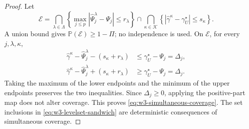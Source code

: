 \documentclass[11pt]{article}
\theoremstyle{remark}
\newcommand{\Pp}{\mathbb P}
\begin{document}
\begin{proof}
Let
\begin{equation}
 \mathcal E=
 \bigcap_{\lambda\in\Lambda}
 \left\{\max_{j\le p}
 |\widehat\Psi_j^\lambda-\Psi_j|\le r_\lambda\right\}
 \cap
 \bigcap_{\kappa\in\mathcal K}
 \left\{|\widehat\gamma^\kappa-\gamma_U^\star|
 \le s_\kappa\right\}.
 \label{eq:w3-good-event}
\end{equation}
A union bound gives $\Pp(\mathcal E)\ge1-\Pi$; no independence is used.
On $\mathcal E$, for every $j,\lambda,\kappa$,
\begin{align}
 \widehat\gamma^\kappa-\widehat\Psi_j^\lambda
 -(s_\kappa+r_\lambda)
 &\le \gamma_U^\star-\Psi_j=\Delta_j,
 \label{eq:w3-pair-lower}\\
 \widehat\gamma^\kappa-\widehat\Psi_j^\lambda
 +(s_\kappa+r_\lambda)
 &\ge \gamma_U^\star-\Psi_j=\Delta_j.
 \label{eq:w3-pair-upper}
\end{align}
Taking the maximum of the lower endpoints and the minimum of the upper
endpoints preserves the two inequalities.  Since $\Delta_j\ge0$, applying the
positive-part map does not alter coverage.  This proves
\eqref{eq:w3-simultaneous-coverage}.  The set inclusions in
\eqref{eq:w3-levelset-sandwich} are deterministic consequences of simultaneous
coverage.
\end{proof}
\end{document}
